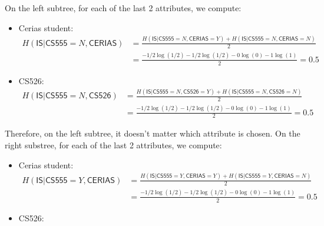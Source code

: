 \documentclass{article}
\begin{document}
\begin{enumerate}
\begin{enumerate}
         On the left subtree, for each of the last 2 attributes, we compute:
         \begin{itemize}
             \item Cerias student: 
             \begin{equation}
             \begin{split}
             H(\mathsf{IS} |\mathsf{CS555} = N, \mathsf{CERIAS}) &= \frac{H(\mathsf{IS} | \mathsf{CS555} = N,\mathsf{CERIAS} = Y) + H(\mathsf{IS} |\mathsf{CS555} = N, \mathsf{CERIAS} = N)}{2}
             \\&= \frac{-1/2\log(1/2) - 1/2\log(1/2) - 0\log(0)-1\log(1)}{2} = 0.5
             \end{split}
             \end{equation}
             \item CS526:
             \begin{equation}
             \begin{split}
             H(\mathsf{IS} |\mathsf{CS555} = N, \mathsf{CS526}) &= \frac{H(\mathsf{IS} | \mathsf{CS555} = N,\mathsf{CS526} = Y) + H(\mathsf{IS} |\mathsf{CS555} = N, \mathsf{CS526} = N)}{2}
             \\&= \frac{-1/2\log(1/2) - 1/2\log(1/2) - 0\log(0)-1\log(1)}{2} = 0.5
             \end{split}
             \end{equation}
         \end{itemize}
         Therefore, on the left subtree, it doesn't matter which attribute is chosen.
         On the right substree, for each of the last 2 attributes,  we compute:
         \begin{itemize}
             \item Cerias student: 
             \begin{equation}
             \begin{split}
             H(\mathsf{IS} |\mathsf{CS555} = Y, \mathsf{CERIAS}) &= \frac{H(\mathsf{IS} | \mathsf{CS555} = Y,\mathsf{CERIAS} = Y) + H(\mathsf{IS} |\mathsf{CS555} = Y, \mathsf{CERIAS} = N)}{2}
             \\&= \frac{-1/2\log(1/2) - 1/2\log(1/2) - 0\log(0)-1\log(1)}{2} = 0.5
             \end{split}
             \end{equation}
             \item CS526:
             \begin{equation}
             \begin{split}

\end{split}
\end{equation}
\end{itemize}
\end{enumerate}
\end{enumerate}
\end{document}
